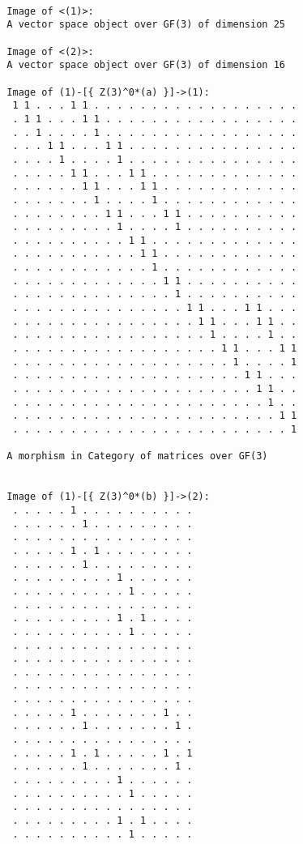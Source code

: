 \begin{computation}
\begin{Verbatim}[commandchars=!@|,fontsize=\small,frame=single,label=Example]
  
  Image of <(1)>:
  A vector space object over GF(3) of dimension 25
  
  Image of <(2)>:
  A vector space object over GF(3) of dimension 16
  
  Image of (1)-[{ Z(3)^0*(a) }]->(1):
   1 1 . . . 1 1 . . . . . . . . . . . . . . . . . .
   . 1 1 . . . 1 1 . . . . . . . . . . . . . . . . .
   . . 1 . . . . 1 . . . . . . . . . . . . . . . . .
   . . . 1 1 . . . 1 1 . . . . . . . . . . . . . . .
   . . . . 1 . . . . 1 . . . . . . . . . . . . . . .
   . . . . . 1 1 . . . 1 1 . . . . . . . . . . . . .
   . . . . . . 1 1 . . . 1 1 . . . . . . . . . . . .
   . . . . . . . 1 . . . . 1 . . . . . . . . . . . .
   . . . . . . . . 1 1 . . . 1 1 . . . . . . . . . .
   . . . . . . . . . 1 . . . . 1 . . . . . . . . . .
   . . . . . . . . . . 1 1 . . . . . . . . . . . . .
   . . . . . . . . . . . 1 1 . . . . . . . . . . . .
   . . . . . . . . . . . . 1 . . . . . . . . . . . .
   . . . . . . . . . . . . . 1 1 . . . . . . . . . .
   . . . . . . . . . . . . . . 1 . . . . . . . . . .
   . . . . . . . . . . . . . . . 1 1 . . . 1 1 . . .
   . . . . . . . . . . . . . . . . 1 1 . . . 1 1 . .
   . . . . . . . . . . . . . . . . . 1 . . . . 1 . .
   . . . . . . . . . . . . . . . . . . 1 1 . . . 1 1
   . . . . . . . . . . . . . . . . . . . 1 . . . . 1
   . . . . . . . . . . . . . . . . . . . . 1 1 . . .
   . . . . . . . . . . . . . . . . . . . . . 1 1 . .
   . . . . . . . . . . . . . . . . . . . . . . 1 . .
   . . . . . . . . . . . . . . . . . . . . . . . 1 1
   . . . . . . . . . . . . . . . . . . . . . . . . 1
  
  A morphism in Category of matrices over GF(3)
  
  
  Image of (1)-[{ Z(3)^0*(b) }]->(2):
   . . . . . 1 . . . . . . . . . .
   . . . . . . 1 . . . . . . . . .
   . . . . . . . . . . . . . . . .
   . . . . . 1 . 1 . . . . . . . .
   . . . . . . 1 . . . . . . . . .
   . . . . . . . . . 1 . . . . . .
   . . . . . . . . . . 1 . . . . .
   . . . . . . . . . . . . . . . .
   . . . . . . . . . 1 . 1 . . . .
   . . . . . . . . . . 1 . . . . .
   . . . . . . . . . . . . . . . .
   . . . . . . . . . . . . . . . .
   . . . . . . . . . . . . . . . .
   . . . . . . . . . . . . . . . .
   . . . . . . . . . . . . . . . .
   . . . . . 1 . . . . . . . 1 . .
   . . . . . . 1 . . . . . . . 1 .
   . . . . . . . . . . . . . . . .
   . . . . . 1 . 1 . . . . . 1 . 1
   . . . . . . 1 . . . . . . . 1 .
   . . . . . . . . . 1 . . . . . .
   . . . . . . . . . . 1 . . . . .
   . . . . . . . . . . . . . . . .
   . . . . . . . . . 1 . 1 . . . .
   . . . . . . . . . . 1 . . . . .
  

\end{Verbatim}
\end{computation}
